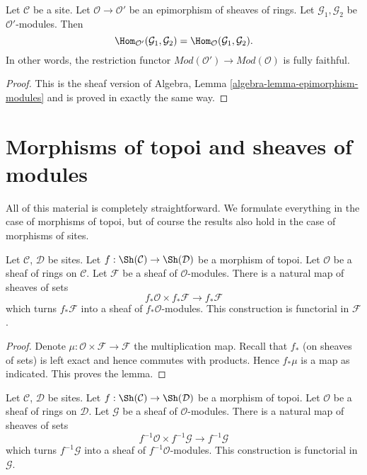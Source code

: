 \begin{lemma}
\label{lemma-epimorphism-modules}
Let $\mathcal{C}$ be a site.
Let $\mathcal{O} \to \mathcal{O}'$ be an epimorphism of sheaves of rings.
Let $\mathcal{G}_1, \mathcal{G}_2$ be $\mathcal{O}'$-modules.
Then
$$
\Hom_{\mathcal{O}'}(\mathcal{G}_1, \mathcal{G}_2) =
\Hom_\mathcal{O}(\mathcal{G}_1, \mathcal{G}_2).
$$
In other words, the restriction functor
$\textit{Mod}(\mathcal{O}') \to \textit{Mod}(\mathcal{O})$ is fully faithful.
\end{lemma}

\begin{proof}
This is the sheaf version of
Algebra, Lemma \ref{algebra-lemma-epimorphism-modules}
and is proved in exactly the same way.
\end{proof}




\section{Morphisms of topoi and sheaves of modules}
\label{section-sheaves-modules-functorial}

\noindent
All of this material is completely straightforward.
We formulate everything in the case of morphisms of topoi,
but of course the results also hold in the case of morphisms of sites.

\begin{lemma}
\label{lemma-pushforward-module}
Let $\mathcal{C}$, $\mathcal{D}$ be sites.
Let $f : \Sh(\mathcal{C}) \to \Sh(\mathcal{D})$
be a morphism of topoi.
Let $\mathcal{O}$ be a sheaf of rings on $\mathcal{C}$.
Let $\mathcal{F}$ be a sheaf of $\mathcal{O}$-modules.
There is a natural map of sheaves of sets
$$
f_*\mathcal{O} \times f_*\mathcal{F}
\longrightarrow
f_*\mathcal{F}
$$
which turns $f_*\mathcal{F}$ into a sheaf of $f_*\mathcal{O}$-modules.
This construction is functorial in $\mathcal{F}$.
\end{lemma}

\begin{proof}
Denote $\mu : \mathcal{O} \times \mathcal{F} \to \mathcal{F}$ the
multiplication map. Recall that $f_*$ (on sheaves of sets) is left exact
and hence commutes with products. Hence $f_*\mu$ is a map as
indicated. This proves the lemma.
\end{proof}

\begin{lemma}
\label{lemma-pullback-module}
Let $\mathcal{C}$, $\mathcal{D}$ be sites.
Let $f : \Sh(\mathcal{C}) \to \Sh(\mathcal{D})$
be a morphism of topoi.
Let $\mathcal{O}$ be a sheaf of rings on $\mathcal{D}$.
Let $\mathcal{G}$ be a sheaf of $\mathcal{O}$-modules.
There is a natural map of sheaves of sets
$$
f^{-1}\mathcal{O} \times f^{-1}\mathcal{G}
\longrightarrow
f^{-1}\mathcal{G}
$$
which turns $f^{-1}\mathcal{G}$ into a sheaf of $f^{-1}\mathcal{O}$-modules.
This construction is functorial in $\mathcal{G}$.
\end{lemma}


